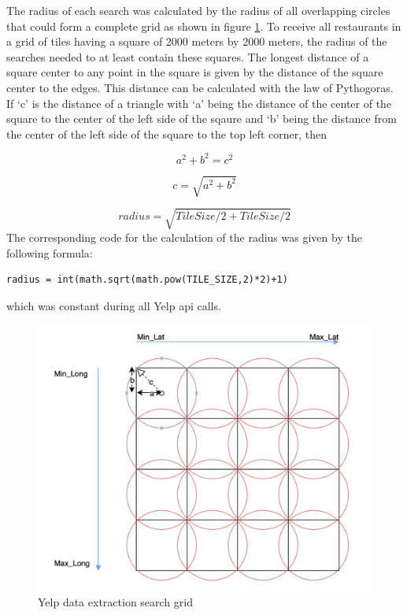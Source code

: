 \documentclass[a4paper, 11pt, oneside]{Thesis}  %
\begin{document}
The radius of each search was calculated by the radius of all overlapping circles that could form a complete grid as shown in figure \ref{fig:Yelp_extraction_grid}. To receive all restaurants in a grid of tiles having a square of 2000 meters by 2000 meters, the radius of the searches needed to at least contain these squares. The longest distance of a square center to any point in the square is given by the distance of the square center to the edges. This distance can be calculated with the law of Pythogoras. If `c' is the distance of a triangle with `a' being the distance of the center of the square to the center of the left side of the sqaure and `b' being the distance from the center of the left side of the square to the top left corner, then

\begin{equation}
 a^2 + b^2 = c^2
\end{equation}
 
\begin{equation}
 c = \sqrt{a^2+b^2}
\end{equation}
 
\begin{equation}
 radius = \sqrt{Tile Size/2 + Tile Size/2}
\end{equation}
The corresponding code for the calculation of the radius was given by the following formula:

\begin{verbatim}
radius = int(math.sqrt(math.pow(TILE_SIZE,2)*2)+1)
\end{verbatim}

which was constant during all Yelp \ac{api} calls.

\begin{figure}[h]
\includegraphics[scale=0.4]{Figures/Yelp_extraction_grid.jpeg}
\centering
\caption{Yelp data extraction search grid}
\label{fig:Yelp_extraction_grid}
\end{figure}
\end{document}
